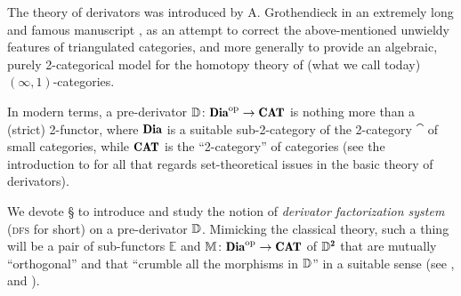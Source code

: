   
\smallskip
The theory of derivators was introduced by A\@. Grothendieck in an extremely long and famous manuscript \cite{tendieckderiv}, as an attempt to correct the above\hyp{}mentioned unwieldy features of triangulated categories, and more generally to provide an algebraic, purely 2-categorical model for the homotopy theory of (what we call today) $(\infty,1)$\hyp{}categories.

In modern terms, a pre-derivator $\D\colon \Dia^\opp\to\Cat$ is nothing more than a (strict) 2-functor, where $\Dia$ is a suitable sub\hyp{}2\hyp{}category of the 2-category $\cat$ of small categories, while $\Cat$ is the ``2-category'' of categories (see the introduction to \cite{Moritz} for all that regards set-theoretical issues in the basic theory of derivators).

We devote § to introduce and study the notion of \emph{derivator factorization system} (\textsc{dfs} for short) on a pre-derivator $\mathbb{D}$. Mimicking the classical theory, such a thing will be a pair of sub-functors $\mathbb E$ and $\mathbb M\colon \Dia^\opp\to\Cat$ of $\D^\due$ that are mutually ``orthogonal'' and that ``crumble all the morphisms in $\mathbb{D}$'' in a suitable sense (see \adef{},  and ).

